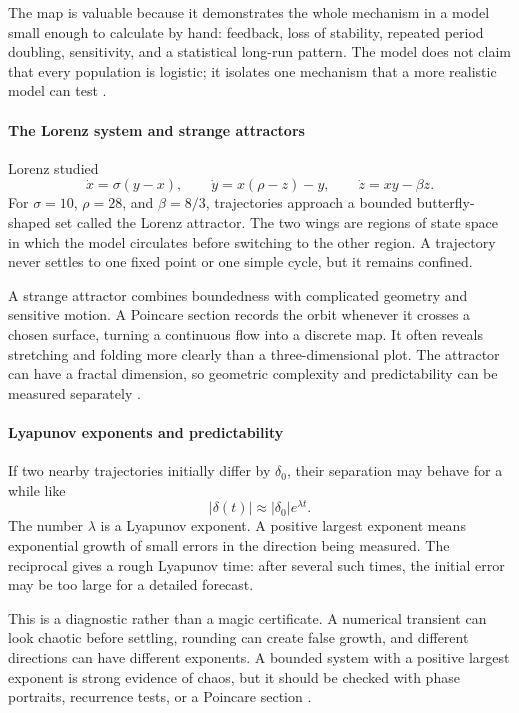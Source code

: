 The map is valuable because it demonstrates the whole mechanism in a model
small enough to calculate by hand: feedback, loss of stability, repeated
period doubling, sensitivity, and a statistical long-run pattern. The model
does not claim that every population is logistic; it isolates one mechanism
that a more realistic model can test \cite{chaos_theory_ref1}.

\paragraph{The Lorenz system and strange attractors}
Lorenz studied
\[
\dot{x}=\sigma(y-x),\qquad
\dot{y}=x(\rho-z)-y,\qquad
\dot{z}=xy-\beta z.
\]
For $\sigma=10$, $\rho=28$, and $\beta=8/3$, trajectories approach a
bounded butterfly-shaped set called the Lorenz attractor. The two wings are
regions of state space in which the model circulates before switching to the
other region. A trajectory never settles to one fixed point or one simple
cycle, but it remains confined.

A strange attractor combines boundedness with complicated geometry and
sensitive motion. A Poincare section records the orbit whenever it crosses a
chosen surface, turning a continuous flow into a discrete map. It often
reveals stretching and folding more clearly than a three-dimensional plot.
The attractor can have a fractal dimension, so geometric complexity and
predictability can be measured separately \cite{chaos_theory_ref3}.

\paragraph{Lyapunov exponents and predictability}
If two nearby trajectories initially differ by $\delta_0$, their separation
may behave for a while like
\[
|\delta(t)|\approx |\delta_0|e^{\lambda t}.
\]
The number $\lambda$ is a Lyapunov exponent. A positive largest exponent
means exponential growth of small errors in the direction being measured.
The reciprocal gives a rough Lyapunov time: after several such times, the
initial error may be too large for a detailed forecast.

This is a diagnostic rather than a magic certificate. A numerical transient
can look chaotic before settling, rounding can create false growth, and
different directions can have different exponents. A bounded system with a
positive largest exponent is strong evidence of chaos, but it should be
checked with phase portraits, recurrence tests, or a Poincare section
\cite{chaos_theory_ref1}.


